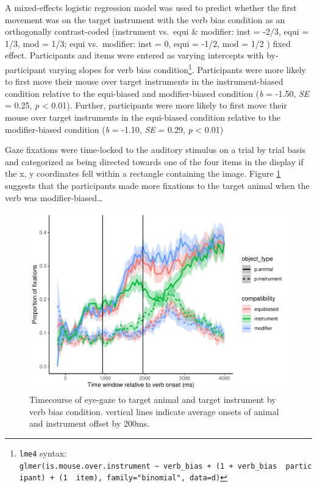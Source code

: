 \documentclass[
  english,
  man,floatsintext]{apa6}
\begin{document}
A mixed-effects logistic regression model was used to predict whether the first movement was on the target instrument with the verb bias condition as an orthogonally contrast-coded (instrument vs.~equi \& modifier: inst = -2/3, equi = 1/3, mod = 1/3; equi vs.~modifier: inst = 0, equi = -1/2, mod = 1/2 ) fixed effect. Participants and items were entered as varying intercepts with by-participant varying slopes for verb bias condition\footnote{\texttt{lme4} syntax: \texttt{glmer(is.mouse.over.instrument\ \textasciitilde{}\ verb\_bias\ +\ (1\ +\ verb\_bias\ \textbar{}\ participant)\ +\ (1\ \textbar{}\ item),\ family="binomial",\ data=d)}}. Participants were more likely to first move their mouse over target instruments in the instrument-biased condition relative to the equi-biased and modifier-biased condition (\emph{b} = -1.50, \emph{SE} = 0.25, \emph{p} \textless{} 0.01). Further, participants were more likely to first move their mouse over target instruments in the equi-biased condition relative to the modifier-biased condition (\emph{b} = -1.10, \emph{SE} = 0.29, \emph{p} \textless{} 0.01)

Gaze fixations were time-locked to the auditory stimulus on a trial by trial basis and categorized as being directed towards one of the four items in the display if the x, y coordinates fell within a rectangle containing the image. Figure \ref{fig:E4-gaze-timecourse-fig} suggests that the participants made more fixations to the target animal when the verb was modifier-biased\ldots{}

\begin{figure}
\centering
\includegraphics{manuscript_files/figure-latex/E4-gaze-timecourse-fig-1.pdf}
\caption{\label{fig:E4-gaze-timecourse-fig}Timecourse of eye-gaze to target animal and target instrument by verb bias condition. vertical lines indicate average onsets of animal and instrument offset by 200ms.}
\end{figure}
\end{document}
